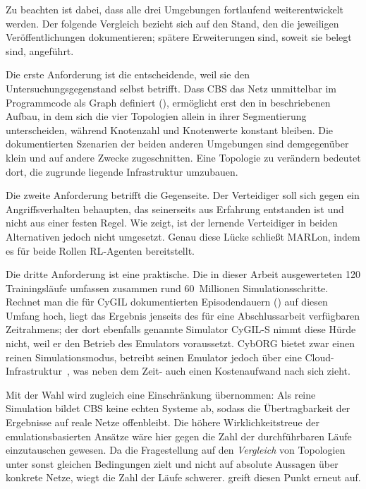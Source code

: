 Zu beachten ist dabei, dass alle drei Umgebungen fortlaufend weiterentwickelt
werden. Der folgende Vergleich bezieht sich auf den Stand, den die jeweiligen
Veröffentlichungen dokumentieren; spätere Erweiterungen sind, soweit sie belegt
sind, angeführt.

Die erste Anforderung ist die entscheidende, weil sie den Untersuchungsgegenstand
selbst betrifft. Dass \ac{CBS} das Netz unmittelbar im Programmcode als
Graph definiert (), ermöglicht erst den in
beschriebenen Aufbau, in dem sich die vier Topologien allein in ihrer
Segmentierung unterscheiden, während Knotenzahl und Knotenwerte konstant
bleiben. Die dokumentierten Szenarien der beiden anderen Umgebungen sind
demgegenüber klein und auf andere Zwecke zugeschnitten. Eine Topologie zu
verändern bedeutet dort, die zugrunde liegende Infrastruktur umzubauen.

Die zweite Anforderung betrifft die Gegenseite. Der Verteidiger soll sich gegen
ein Angriffsverhalten behaupten, das seinerseits aus Erfahrung entstanden ist
und nicht aus einer festen Regel. Wie  zeigt, ist der
lernende Verteidiger in beiden Alternativen jedoch nicht umgesetzt. Genau diese
Lücke schließt MARLon, indem es für beide Rollen \ac{RL}-Agenten bereitstellt.

Die dritte Anforderung ist eine praktische. Die in dieser Arbeit ausgewerteten
120 Trainingsläufe umfassen zusammen rund 60~Millionen
Simulationsschritte.
Rechnet man die für CyGIL dokumentierten Episodendauern
() auf diesen Umfang hoch, liegt das Ergebnis jenseits
des für eine Abschlussarbeit verfügbaren Zeitrahmens; der dort ebenfalls
genannte Simulator CyGIL-S nimmt diese Hürde nicht, weil er den Betrieb des
Emulators voraussetzt. CybORG bietet zwar
einen reinen Simulationsmodus, betreibt seinen Emulator jedoch über eine
Cloud-Infrastruktur~\cite{standen2021cyborg}, was neben dem Zeit- auch einen
Kostenaufwand nach sich zieht.

Mit der Wahl wird zugleich eine Einschränkung übernommen: Als reine Simulation
bildet \ac{CBS} keine echten Systeme ab, sodass die Übertragbarkeit der
Ergebnisse auf reale Netze offenbleibt. Die höhere Wirklichkeitstreue der
emulationsbasierten Ansätze wäre hier gegen die Zahl der durchführbaren Läufe
einzutauschen gewesen. Da die Fragestellung auf den \emph{Vergleich} von
Topologien unter sonst gleichen Bedingungen zielt und nicht auf absolute
Aussagen über konkrete Netze, wiegt die Zahl der Läufe schwerer.
 greift diesen Punkt erneut auf.

